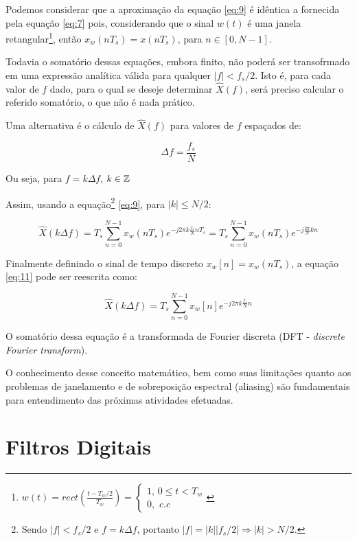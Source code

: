 		Podemos considerar que a aproximação da equação \eqref{eq:9} é idêntica a fornecida pela equação \eqref{eq:7} pois, considerando que o sinal $w(t)$ é uma janela retangular\footnote{$w(t) = rect\left(\frac{t-T_w/2}{T_w}\right) = \begin{cases}1,\, 0\le t < T_w \\ 0, \,\, c.c\end{cases}$}, então $x_w(nT_s) = x(nT_s)$, para $n\in [0,N-1]$.
		
		Todavia o somatório dessas equações, embora finito, não poderá ser transofrmado em uma expressão analítica válida para qualquer $|f|<f_s/2$. Isto é, para cada valor de $f$ dado, para o qual se deseje determinar $\hat{X}(f)$, será preciso calcular o referido somatório, o que não é nada prático.
		
		Uma alternativa é o cálculo de $\hat{X}(f)$ para valores de $f$ espaçados de:
		
		\begin{equation}
			\label{eq:10}
			\Delta f = \frac{f_s}{N}
		\end{equation}
		
		Ou seja, para $f = k\Delta f$, $k\in \mathbb{Z}$
		
		Assim, usando a equação\footnote{Sendo $|f|<f_s/2$ e $f = k\Delta f$, portanto $|f| = |k||f_s/2|\Rightarrow |k|>N/2$.} \eqref{eq:9}, para $|k|\le N/2$:
		
		\begin{equation}
		\label{eq:11}
		\hat{X}(k\Delta f) = T_s \sum_{n=0}^{N-1}x_w(nT_s)e^{-j2\pi k \frac{f_s}{N}nT_s} = T_s\sum_{n=0}^{N-1}x_w(nT_s)e^{-j\frac{2\pi}{N}kn}
		\end{equation}
		
		
		Finalmente definindo o sinal de tempo discreto $x_w[n] = x_w(nT_s)$, a equação \eqref{eq:11} pode ser reescrita como:
		
		\begin{equation}
		\label{eq:12}
		\hat{X}(k\Delta f) = T_s\sum_{n=0}^{N-1}x_w[n]e^{-j2\pi k \frac{f_s}{N}n}
		\end{equation}
		
		O somatório dessa equação é a transformada de Fourier discreta (DFT - \textit{discrete Fourier transform}).
		
		O conhecimento desse conceito matemático, bem como suas limitações quanto aos problemas de janelamento e de sobreposição espectral (aliasing) são fundamentais para entendimento das próximas atividades efetuadas.
	
\section{Filtros Digitais}

